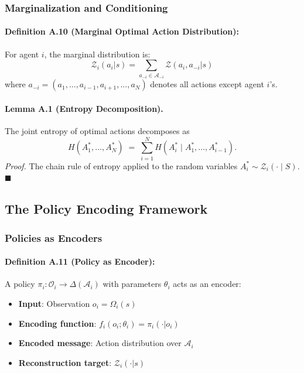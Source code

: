 \documentclass[10pt, letterpaper]{article}
\begin{document}
\subsubsection{Marginalization and Conditioning}

\paragraph{Definition A.10 (Marginal Optimal Action Distribution):} For agent $i$, the marginal distribution is:
\[\mathcal{Z}_i(a_i|s) = \sum_{a_{-i} \in \mathcal{A}_{-i}} \mathcal{Z}(a_i, a_{-i}|s)\]
where $a_{-i} = (a_1, ..., a_{i-1}, a_{i+1}, ..., a_N)$ denotes all actions except agent $i$'s.

\paragraph{Lemma A.1 (Entropy Decomposition).} The joint entropy of optimal actions decomposes as
\[H(A_1^*, \ldots, A_N^*) \;=\; \sum_{i=1}^N H(A_i^* \mid A_1^*, \ldots, A_{i-1}^*).\]
\emph{Proof.} The chain rule of entropy applied to the random variables $A_i^* \sim \mathcal{Z}_i(\cdot \mid S)$. $\blacksquare$

\subsection{The Policy Encoding Framework}

\subsubsection{Policies as Encoders}

\paragraph{Definition A.11 (Policy as Encoder):} A policy $\pi_i: \mathcal{O}_i \to \Delta(\mathcal{A}_i)$ with parameters $\theta_i$ acts as an encoder:
\begin{itemize}
    \item \textbf{Input}: Observation $o_i = \Omega_i(s)$
    \item \textbf{Encoding function}: $f_i(o_i; \theta_i) = \pi_i(\cdot|o_i)$
    \item \textbf{Encoded message}: Action distribution over $\mathcal{A}_i$
    \item \textbf{Reconstruction target}: $\mathcal{Z}_i(\cdot|s)$
\end{itemize}
\end{document}

